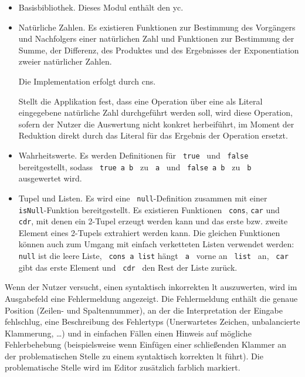 \documentclass[parskip=full,11pt,twoside]{scrartcl}
\begin{document}
\begin{itemize}
	\item Basisbibliothek. Dieses Modul enthält den \gls{yc}.
	
	\item Natürliche Zahlen. Es existieren Funktionen zur Bestimmung des Vorgängers
	und Nachfolgers einer natürlichen Zahl und Funktionen zur Bestimmung der Summe,
	der Differenz, des Produktes und des Ergebnisses der Exponentiation zweier
	natürlicher Zahlen.
	
	Die Implementation erfolgt durch \glspl{cn}.

	Stellt die Applikation fest, dass eine Operation über eine als Literal
	eingegebene natürliche Zahl durchgeführt werden soll, wird diese Operation, sofern
	der Nutzer die Auswertung nicht konkret herbeiführt, im Moment der Reduktion direkt durch das Literal
	für das Ergebnis der Operation ersetzt.
	
	\item Wahrheitswerte. Es werden Definitionen für \texttt{ true } und \texttt{ false }
	bereitgestellt, sodass \texttt{ true a b } zu \texttt{ a } und \texttt{ false a b }
	zu \texttt{ b } ausgewertet wird.
	
	\item Tupel und Listen. Es wird eine \texttt{ null}-Definition zusammen mit einer
	\texttt{ isNull}-Funktion bereitgestellt. Es existieren Funktionen
	\texttt{ cons}, \texttt{car} und \texttt{ cdr}, %
	mit denen ein 2-Tupel erzeugt werden kann und das erste bzw. zweite Element
	eines 2-Tupels extrahiert werden kann. Die gleichen Funktionen können auch zum
	Umgang mit einfach verketteten Listen verwendet werden: \texttt{null} ist die
	leere Liste, \texttt{ cons a list} hängt \texttt{ a } vorne an \texttt{ list } an,
	\texttt{ car } gibt das erste Element und \texttt{ cdr } den Rest der Liste zurück.
\end{itemize}

Wenn der Nutzer versucht, einen syntaktisch inkorrekten \gls{lt} auszuwerten,
wird im Ausgabefeld eine Fehlermeldung angezeigt. Die Fehlermeldung enthält die genaue Position (Zeilen-
und Spaltennummer), an der die Interpretation der Eingabe fehlschlug, eine Beschreibung
des Fehlertyps (Unerwartetes Zeichen, unbalancierte Klammerung, \ldots) und in einfachen
Fällen einen Hinweis auf mögliche Fehlerbehebung (beispielsweise wenn Einfügen einer
schließenden Klammer an der problematischen Stelle zu einem syntaktisch korrekten
\gls{lt} führt).
Die problematische Stelle wird im Editor zusätzlich farblich markiert.
\end{document}
